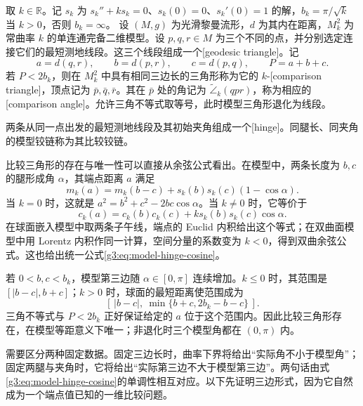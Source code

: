 \begin{definition}\label{g3:def:comparison-triangle}
	取 \(k\in\mathbb R\)。记 \(s_k\) 为 \(s_k''+ks_k=0\)、\(s_k(0)=0\)、\(s_k'(0)=1\) 的解，\(b_k=\pi/\sqrt k\) 当 \(k>0\)，否则 \(b_k=\infty\)。
 设 \((M,g)\) 为光滑黎曼流形，\(d\) 为其内在距离，\(M_k^2\) 为常曲率 \(k\) 的单连通完备二维模型。设 \(p,q,r\in M\) 为三个不同的点，并分别选定连接它们的最短测地线段。这三个线段组成一个[geodesic triangle]。记
 \[
 a=d(q,r),\qquad b=d(p,r),\qquad c=d(p,q),\qquad P=a+b+c.
 \]
 若 \(P<2b_k\)，则在 \(M_k^2\) 中具有相同三边长的三角形称为它的 \(k\)-[comparison triangle]，顶点记为 \(\bar p,\bar q,\bar r\)。其在 \(\bar p\) 处的角记为 \(\widetilde\angle_k(qpr)\)，称为相应的[comparison angle]。允许三角不等式取等号，此时模型三角形退化为线段。

 两条从同一点出发的最短测地线段及其初始夹角组成一个[hinge]。同腿长、同夹角的模型铰链称为其比较铰链。
\end{definition}

比较三角形的存在与唯一性可以直接从余弦公式看出。在模型中，两条长度为 \(b,c\) 的腿形成角 \(\alpha\)，其端点距离 \(a\) 满足
\begin{equation}\label{g3:eq:model-hinge-cosine}
 m_k(a)=m_k(b-c)+s_k(b)s_k(c)(1-\cos\alpha).
\end{equation}
当 \(k=0\) 时，这就是 \(a^2=b^2+c^2-2bc\cos\alpha\)。当 \(k\ne0\) 时，它等价于
\[
 c_k(a)=c_k(b)c_k(c)+k s_k(b)s_k(c)\cos\alpha.
\]
在球面嵌入模型中取两条子午线，端点的 Euclid 内积给出这个等式；在双曲面模型中用 Lorentz 内积作同一计算，空间分量的系数变为 \(k<0\)，得到双曲余弦公式。这也给出统一公式\eqref{g3:eq:model-hinge-cosine}。

\ProseParagraphBreak

若 \(0<b,c<b_k\)，模型第三边随 \(\alpha\in[0,\pi]\) 连续增加。\(k\le0\) 时，其范围是 \([|b-c|,b+c]\)；\(k>0\) 时，球面的最短距离使范围成为
\[
 [\,|b-c|,\ \min\{b+c,2b_k-b-c\}\,].
\]
三角不等式与 \(P<2b_k\) 正好保证给定的 \(a\) 位于这个范围内。因此比较三角形存在，在模型等距意义下唯一；非退化时三个模型角都在 \((0,\pi)\) 内。

\ProseParagraphBreak

需要区分两种固定数据。固定三边长时，曲率下界将给出“实际角不小于模型角”；固定两腿与夹角时，它将给出“实际第三边不大于模型第三边”。两句话由式\eqref{g3:eq:model-hinge-cosine}的单调性相互对应。以下先证明三边形式，因为它自然成为一个端点值已知的一维比较问题。

